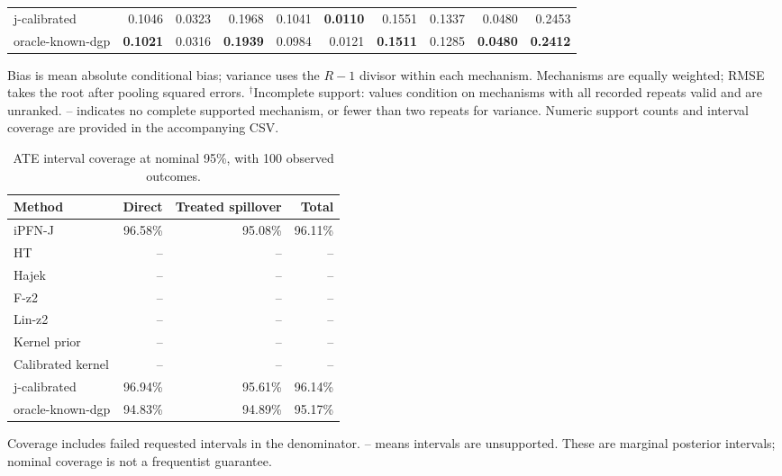 \begin{table}[tb]
\begin{tabular*}{\linewidth}{@{\extracolsep{\fill}}l*{9}{r}@{}}
j-calibrated & \cellcolor{blue!17}0.1046 & \cellcolor{blue!7}0.0323 & \cellcolor{blue!17}0.1968 & \cellcolor{blue!7}0.1041 & \cellcolor{blue!24}\textbf{0.0110} & \cellcolor{blue!17}0.1551 & \cellcolor{blue!11}0.1337 & \cellcolor{blue!17}0.0480 & \cellcolor{blue!17}0.2453 \\
oracle-known-dgp & \cellcolor{blue!24}\textbf{0.1021} & \cellcolor{blue!11}0.0316 & \cellcolor{blue!24}\textbf{0.1939} & \cellcolor{blue!17}0.0984 & \cellcolor{blue!11}0.0121 & \cellcolor{blue!24}\textbf{0.1511} & \cellcolor{blue!17}0.1285 & \cellcolor{blue!24}\textbf{0.0480} & \cellcolor{blue!24}\textbf{0.2412} \\
\bottomrule
\end{tabular*}\endgroup
\vspace{3pt}
\begin{minipage}{\linewidth}\scriptsize
Bias is mean absolute conditional bias; variance uses the $R-1$ divisor within each mechanism.
Mechanisms are equally weighted; RMSE takes the root after pooling squared errors.
$^{\dagger}$Incomplete support: values condition on mechanisms with all recorded repeats valid and are unranked.
-- indicates no complete supported mechanism, or fewer than two repeats for variance.
Numeric support counts and interval coverage are provided in the accompanying CSV.
\end{minipage}
\end{table}

\begin{table}[tb]
\centering
\caption{ATE interval coverage at nominal 95\%, with 100 observed outcomes.}
\begin{tabular}{lrrr}
\toprule
Method & Direct & Treated spillover & Total \\
\midrule
iPFN-J & 96.58\% & 95.08\% & 96.11\% \\
HT & -- & -- & -- \\
Hajek & -- & -- & -- \\
F-z2 & -- & -- & -- \\
Lin-z2 & -- & -- & -- \\
Kernel prior & -- & -- & -- \\
Calibrated kernel & -- & -- & -- \\
j-calibrated & 96.94\% & 95.61\% & 96.14\% \\
oracle-known-dgp & 94.83\% & 94.89\% & 95.17\% \\
\bottomrule
\end{tabular}
\par\smallskip
\begin{minipage}{\linewidth}\scriptsize
Coverage includes failed requested intervals in the denominator. -- means intervals are unsupported.
These are marginal posterior intervals; nominal coverage is not a frequentist guarantee.
\end{minipage}
\end{table}
